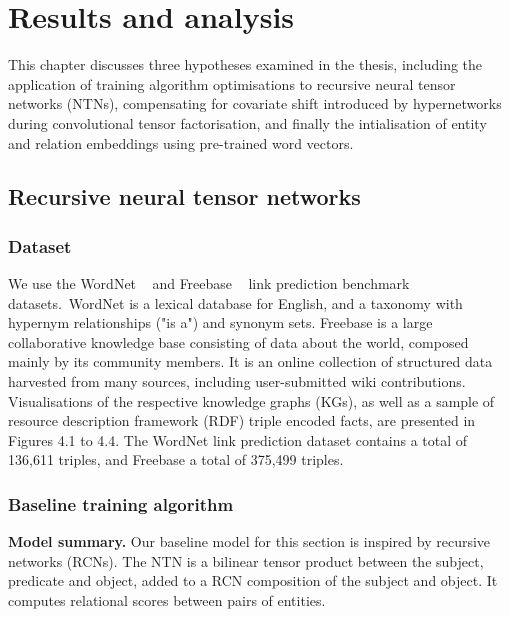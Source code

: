 

\chapter{Results and analysis}  %

\ifpdf
     \graphicspath{{Figs/Chapter4/}}
\else
    \graphicspath{{Chapter4/Figs/Vector/}{Chapter4/Figs/}}
\fi

This chapter discusses three hypotheses examined in the thesis, including the application of training algorithm optimisations to recursive neural tensor networks (NTNs), compensating for covariate shift introduced by hypernetworks during convolutional tensor factorisation, and finally the intialisation of entity and relation embeddings using pre-trained word vectors. 



\section{Recursive neural tensor networks}

\subsection{Dataset} 

We use the WordNet \unskip ~\citep{miller1995wordnet} and Freebase \unskip ~\citep{bollacker2008freebase} link prediction benchmark datasets.\ WordNet is a lexical database for English, and a taxonomy with hypernym relationships ("is a") and synonym sets. Freebase is a large collaborative knowledge base consisting of data about the world, composed mainly by its community members. It is an online collection of structured data harvested from many sources, including user-submitted wiki contributions. Visualisations of the respective knowledge graphs (KGs), as well as a sample of resource description framework (RDF) triple encoded facts, are presented in Figures 4.1 to 4.4. The WordNet link prediction dataset contains a total of 136,611 triples, and Freebase a total of 375,499 triples. 

\subsection{Baseline training algorithm}
\textbf{Model summary.} Our baseline model for this section is inspired by recursive networks (RCNs). The NTN is a bilinear tensor product between the subject, predicate and object, added to a RCN composition of the subject and object. It computes relational scores between pairs of entities. \par

